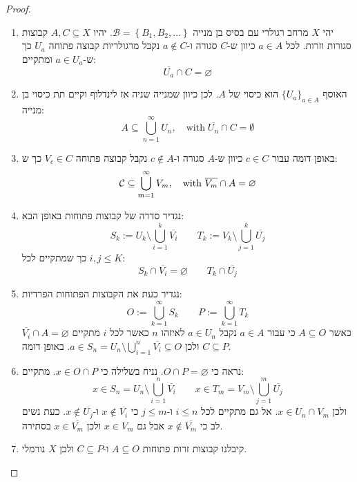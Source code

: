 \documentclass{tstextbook}
\begin{document}
\begin{proof}
  \begin{enumerate}
    \item יהי \(X\) מרחב רגולרי עם בסיס בן מנייה \(\mathcal{B}=\left\{  B_{1},B_{2},\dots  \right\}\). יהיו \(A,C \subseteq X\) קבוצות סגורות וזרות. לכל \(a \in A\) כיוון ש-\(C\) סגורה ו-\(a \not \in C\) נקבל מרגולריות קבוצה פתוחה \(U_{a}\) כך ש-\(a \in U_{a}\) ומתקיים: 
$$\overline{U_{a}} \cap C=\varnothing $$


    \item האוסף \(\{ U_{a} \}_{a \in A}\) הוא כיסוי של \(A\). לכן כיוון שמנייה שניה אז לינדלוף וקיים תת כיסוי בן מנייה: 
$$A\subseteq\bigcup_{n=1}^{\infty}U_{n},\quad{\mathrm{with}}\;{\overline{{U_{n}}}}\cap C=\emptyset$$


    \item באופן דומה עבור \(c \in C\) כיוון ש-\(A\) סגורה ו-\(c \not \in A\) נקבל קבוצה פתוחה \(V_{c}\in C\) כך ש: 
$${\cal C}\subseteq\bigcup_{m=1}^{\infty}V_{m},\quad\mathrm{with}\ \overline{{{V_{m}}}}\cap{ A}=\varnothing $$


    \item נגדיר סדרה של קבוצות פתוחות באופן הבא: 
$$S_{k}:=U_{k}\setminus\bigcup_{i=1}^{k}{\overline{{V_{i}}}}\qquad T_{k}:=V_{k}\setminus\bigcup_{j=1}^{k}{\overline{{U_{j}}}}$$
כך שמתקיים לכל \(i,j\leq K\):
$$S_{k}\cap{\overline{{V_{i}}}}=\varnothing \qquad T_{k}\cap \overline{U_{j}} $$


    \item נגדיר כעת את הקבוצות הפתוחות הפרדיות: 
$${ O}:=\bigcup_{k=1}^{\infty}S_{k}\qquad P:=\bigcup_{k=1}^{\infty}T_{k}$$
כאשר \(A\subseteq O\) כי עבור \(a \in A\) נקבל \(a \in U_{n}\) לאיזהו \(n\) כאשר לכל \(i\) מתקיים \(\overline{V_{i}}\cap A=\varnothing\) ולכן \(a \in S_{n}=U_{n}\setminus \bigcup_{i=1}^{n}\overline{V_{i}}\subseteq O\). באופן דומה \(C\subseteq P\).


    \item נראה כי \(O \cap P=\varnothing\). נניח בשלילה כי \(x \in O\cap P\). מתקיים: 
$$x\in S_{n}=U_{n}\setminus\bigcup_{i=1}^{n}{\overline{{V_{i}}}}\qquad x\in T_{m}=V_{m}\setminus\bigcup_{j=1}^{m}{\overline{{U_{j}}}}$$
ולכן \(x \in U_{n}\cap V_{m}\). אל גם מתקיים לכל \(i\leq n\) ו-\(j\leq m\) כי \(x \not \in \overline{V_{i}}\) ו-\(x\not \in \overline{U_{j}}\). כעת נשים לב כי \(x \not \in \overline{V_{m}}\) אבל גם \(x \in V_{m}\) ולכן \(x \in \overline{V_{m}}\) בסתירה.


    \item קיבלנו קבוצות זרות פתוחות \(A\subseteq O\) ו-\(C\subseteq P\) ולכן \(X\) נורמלי. 


  \end{enumerate}
\end{proof}
\end{document}
